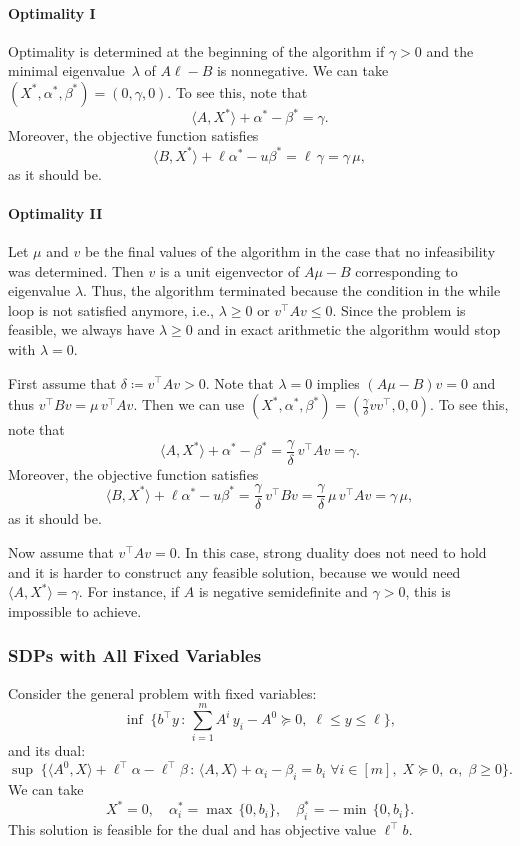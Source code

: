 \documentclass[10pt, a4paper]{article}
\newcommand{\suchthat}{\,:\,}
\newcommand{\define}{\coloneqq}
\newcommand{\skal}[2]{\langle{#1},{#2}\rangle}
\newcommand{\T}{^{\top}}
\begin{document}
\paragraph{Optimality I}

Optimality is determined at the beginning of the algorithm if $\gamma > 0$
and the minimal eigenvalue~$\lambda$ of $A \ell - B$ is nonnegative. We can
take $(X^*, \alpha^*, \beta^*) = (0, \gamma, 0)$. To see this, note that
\[
\skal{A}{X^*} + \alpha^* - \beta^* = \gamma.
\]
Moreover, the objective function satisfies
\[
\skal{B}{X^*} + \ell \alpha^* - u \beta^* = \ell\, \gamma = \gamma\, \mu,
\]
as it should be.

\paragraph{Optimality II}

Let $\mu$ and $v$ be the final values of the algorithm in the case that no
infeasibility was determined. Then $v$ is a unit eigenvector of $A \mu - B$
corresponding to eigenvalue $\lambda$. Thus, the algorithm terminated
because the condition in the while loop is not satisfied anymore, i.e.,
$\lambda \geq 0$ or $v\T A v \leq 0$. Since the problem is feasible, we
always have $\lambda \geq 0$ and in exact arithmetic the algorithm would
stop with $\lambda = 0$.

First assume that $\delta \define v\T A v > 0$. Note that $\lambda = 0$
implies $(A \mu - B)v = 0$ and thus $v\T B v = \mu\, v\T A v$. Then we can
use $(X^*, \alpha^*, \beta^*) = (\frac{\gamma}{\delta} v v\T, 0, 0)$. To
see this, note that
\[
\skal{A}{X^*} + \alpha^* - \beta^* = \frac{\gamma}{\delta}\, v\T A v = \gamma.
\]
Moreover, the objective function satisfies
\[
\skal{B}{X^*} + \ell \alpha^* - u \beta^* = \frac{\gamma}{\delta}\, v\T B v
= \frac{\gamma}{\delta}\, \mu\, v\T A v = \gamma\, \mu,
\]
as it should be.

Now assume that $v\T A v = 0$. In this case, strong duality does not need
to hold and it is harder to construct any feasible solution, because we
would need $\skal{A}{X^*} = \gamma$. For instance, if $A$ is negative
semidefinite and $\gamma > 0$, this is impossible to achieve.




\subsubsection{SDPs with All Fixed Variables}

Consider the general problem with fixed variables:
\[
  \inf\; \{ b\T y \suchthat \sum_{i=1}^m A^i\, y_i - A^0 \succeq 0,\; \ell \leq y \leq \ell\},
\]
and its dual:
\[
  \sup\; \{\skal{A^0}{X} + \ell\T \alpha - \ell\T \beta \suchthat \skal{A}{X} +
  \alpha_i - \beta_i = b_i\; \forall i \in [m],\; X \succeq 0,\; \alpha,\; \beta \geq 0\}.
\]
We can take
\[
X^* = 0,\quad
\alpha^*_i = \max\,\{0, b_i\}, \quad
\beta^*_i = -\min\,\{0, b_i\}.
\]
This solution is feasible for the dual and has objective value $\ell\T b$.

\begin{small}
   
   
\end{small}
\end{document}
